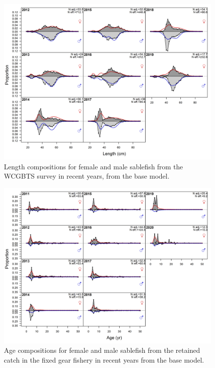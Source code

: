 \documentclass[11pt,
  english,
  a4paper,
]{article}
\begin{document}
\begin{figure}
\centering
\includegraphics[width=1\textwidth,height=1\textheight]{figs/torc_fleet8_lencomps.png}
\caption{Length compositions for female and male sablefish from the WCGBTS survey in recent years, from the base model. \label{fig:torcfleet8lencomps}}
\end{figure}

\tagmcend\tagstructend


\begin{figure}
\centering
\includegraphics[width=1\textwidth,height=1\textheight]{figs/torc_fleet1_agecomps.png}
\caption{Age compositions for female and male sablefish from the retained catch in the fixed gear fishery in recent years from the base model. \label{fig:torcfleet1agecomps}}
\end{figure}
\end{document}
